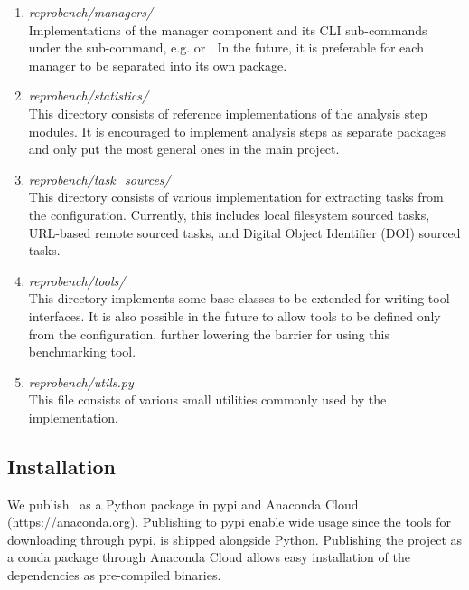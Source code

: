 \begin{enumerate}
    \item \emph{reprobench/managers/}\\
        Implementations of the manager component and its CLI sub-commands under the  sub-command, e.g.  or .
        In the future, it is preferable for each manager to be separated into its own package.

    \item \emph{reprobench/statistics/}\\
        This directory consists of reference implementations of the analysis step modules.
        It is encouraged to implement analysis steps as separate packages and only put the most general ones in the main project.

    \item \emph{reprobench/task\_sources/}\\
        This directory consists of various implementation for extracting tasks from the configuration.
        Currently, this includes local filesystem sourced tasks, URL-based remote sourced tasks, and Digital Object Identifier (DOI) sourced tasks.

    \item \emph{reprobench/tools/}\\
        This directory implements some base classes to be extended for writing tool interfaces.
        It is also possible in the future to allow tools to be defined only from the configuration, further lowering the barrier for using this benchmarking tool.

    \item \emph{reprobench/utils.py}\\
        This file consists of various small utilities commonly used by the implementation.

\end{enumerate}


\subsection{Installation}

We publish \OurBenchmarkingTool~as a Python package in pypi and Anaconda Cloud (\url{https://anaconda.org}).
Publishing to pypi enable wide usage since the tools for downloading through pypi,  is shipped alongside Python.
Publishing the project as a conda package through Anaconda Cloud allows easy installation of the dependencies as pre-compiled binaries.

